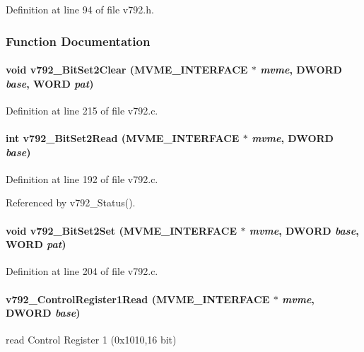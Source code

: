 Definition at line 94 of file v792.h.

\subsubsection{Function Documentation}
\paragraph[{v792\_\-BitSet2Clear}]{\setlength{\rightskip}{0pt plus 5cm}void v792\_\-BitSet2Clear ({\bf MVME\_\-INTERFACE} $\ast$ {\em mvme}, \/  {\bf DWORD} {\em base}, \/  {\bf WORD} {\em pat})}\hfill\label{v792_8h_a42d8b6663477fddc91c9a0eb7791a459}


Definition at line 215 of file v792.c.
\paragraph[{v792\_\-BitSet2Read}]{\setlength{\rightskip}{0pt plus 5cm}int v792\_\-BitSet2Read ({\bf MVME\_\-INTERFACE} $\ast$ {\em mvme}, \/  {\bf DWORD} {\em base})}\hfill\label{v792_8h_ac7a33ef538da1556c4a1ad45e2fc2783}


Definition at line 192 of file v792.c.

Referenced by v792\_\-Status().
\paragraph[{v792\_\-BitSet2Set}]{\setlength{\rightskip}{0pt plus 5cm}void v792\_\-BitSet2Set ({\bf MVME\_\-INTERFACE} $\ast$ {\em mvme}, \/  {\bf DWORD} {\em base}, \/  {\bf WORD} {\em pat})}\hfill\label{v792_8h_a9c71ef67754b6e4b0f319206d75c19ec}


Definition at line 204 of file v792.c.
\paragraph[{v792\_\-ControlRegister1Read}]{ v792\_\-ControlRegister1Read ({\bf MVME\_\-INTERFACE} $\ast$ {\em mvme}, \/  {\bf DWORD} {\em base})}\hfill\label{v792_8h_ab4e2ce6a3f923e95a23d9e6990265b8d}
read Control Register 1 (0x1010,16 bit) 

